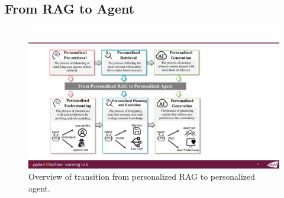 \subsection{From RAG to Agent}
% 

\begin{figure}[t]
    \centering
    \includegraphics[width=\linewidth]{figures/PRAG_agent.pdf}
    \caption{Overview of transition from personalized RAG to personalized agent.}
    \label{fig:Agent}
\end{figure}


